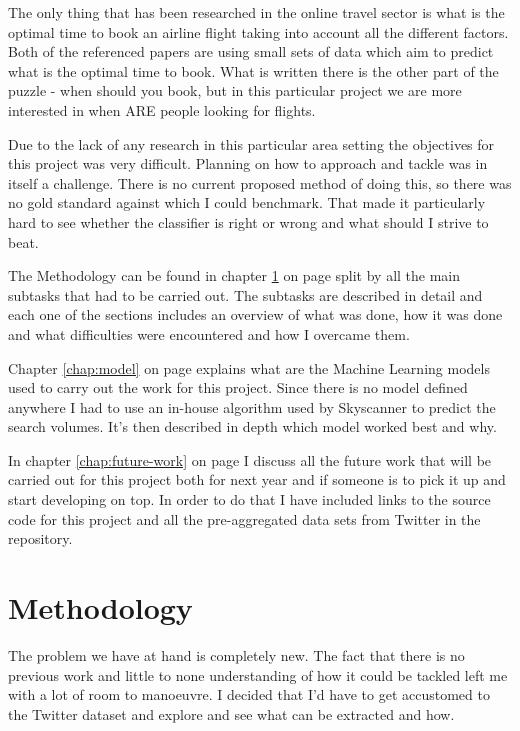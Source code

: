 \documentclass[minf,frontabs,twoside,singlespacing,parskip]{infthesis}
\begin{document}
The only thing that has been researched in the online travel sector is what is the optimal time to book an airline flight taking into account all the different factors. \cite{Hamletkdd03} \cite{ijcai} 
Both of the referenced papers are using small sets of data which aim to predict what is the optimal time to book. What is written there is the other part of the puzzle - when should you book, but in this particular project we are more interested in when ARE people looking for flights.


Due to the lack of any research in this particular area setting the objectives for this project was very difficult. Planning on how to approach and tackle was in itself a challenge. There is no current proposed method of doing this, so there was no gold standard against which I could benchmark. That made it particularly hard to see whether the classifier is right or wrong and what should I strive to beat.


The Methodology can be found in chapter \ref{chap:method} on page \pageref{chap:method} split by all the main subtasks that had to be carried out. The subtasks are described in detail and each one of the sections includes an overview of what was done, how it was done and what difficulties were encountered and how I overcame them. 


Chapter \ref{chap:model} on page \pageref{chap:model} explains what are the Machine Learning models used to carry out the work for this project. Since there is no model defined anywhere I had to use an in-house algorithm used by Skyscanner to predict the search volumes. It's then described in depth which model worked best and why. 


In chapter \ref{chap:future-work} on page \pageref{chap:future-work} I discuss all the future work that will be carried out for this project both for next year and if someone is to pick it up and start developing on top. In order to do that I have included links to the source code for this project and all the pre-aggregated data sets from Twitter in the repository.


\chapter{Methodology}
\label{chap:method}

The problem we have at hand is completely new. The fact that there is no previous work and little to none understanding of how it could be tackled left me with a lot of room to manoeuvre. I decided that I'd have to get accustomed to the Twitter dataset and explore and see what can be extracted and how. 
\end{document}
